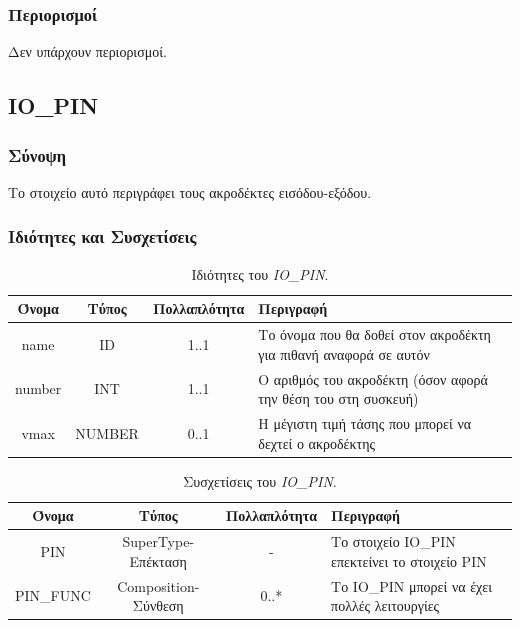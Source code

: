 \subsubsection*{Περιορισμοί}

\noindent Δεν υπάρχουν περιορισμοί.

\subsection{IO\_PIN}
\label{subsec:io_pin}

\subsubsection*{Σύνοψη}

\noindent Το στοιχείο αυτό περιγράφει τους ακροδέκτες εισόδου-εξόδου.

\subsubsection*{Ιδιότητες και Συσχετίσεις}

\begin{table}[H]
	\begin{center}
		\caption{Ιδιότητες του \textit{IO\_PIN}.}
		\label{tab:io_pin1}
		\begin{tabular}{ | c | c | c| m{5.5cm} | }
			\hline
			\rowcolor{Gray}
			Όνομα & Τύπος & Πολλαπλότητα & Περιγραφή \\
			\hline
			name & ID & 1..1 & Το όνομα που θα δοθεί στον ακροδέκτη για πιθανή αναφορά σε αυτόν \\
			\hline
			number & INT & 1..1 & Ο αριθμός του ακροδέκτη (όσον αφορά την θέση του στη συσκευή) \\
			\hline
			vmax & NUMBER & 0..1 & Η μέγιστη τιμή τάσης που μπορεί να δεχτεί ο ακροδέκτης \\
			\hline
		\end{tabular}
	\end{center}
\end{table}

\begin{table}[H]
	\begin{center}
		\caption{Συσχετίσεις του \textit{IO\_PIN}.}
		\label{tab:io_pin2}
		\begin{tabular}{ | c | c | c| m{5.5cm} | }
			\hline
			\rowcolor{Gray}
			Όνομα & Τύπος & Πολλαπλότητα & Περιγραφή \\
			\hline
			PIN & SuperType-Επέκταση & - &  Το στοιχείο IO\_PIN επεκτείνει το στοιχείο PIN \\
			\hline
			PIN\_FUNC & Composition-Σύνθεση & 0..* &  Το IO\_PIN μπορεί να έχει πολλές λειτουργίες \\
			\hline
		\end{tabular}
	\end{center}
\end{table}

